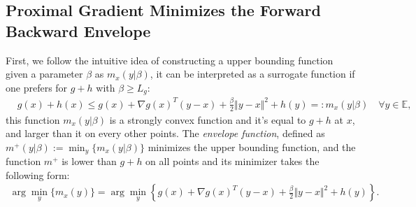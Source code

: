 \documentclass[]{article}
\theoremstyle{definition}
\begin{document}
    \subsection{Proximal Gradient Minimizes the Forward Backward Envelope}
        First, we follow the intuitive idea of constructing a upper bounding function given a parameter $\beta$ as  $m_x(y|\beta)$, it can be interpreted as a surrogate function if one prefers for $g + h$ with $\beta \ge L_g$: 
        \begin{align*}
            & g(x) + h(x) \le 
            g(x) + \nabla g(x)^T(y - x) + \frac{\beta}{2} \Vert y - x\Vert^2
            + h(y) =: m_x(y|\beta) \quad \forall y \in \mathbb E, 
        \end{align*}
        this function $m_x(y|\beta)$ is a strongly convex function and it's equal to $g + h$ at $x$, and larger than it on every other points. The \emph{envelope function}, defined as $m^+(y|\beta):= \min_y \{m_x(y|\beta)\}$ minimizes the upper bounding function, and the function $m^+$ is lower than $g + h$ on all points and its minimizer takes the following form: 
        \begin{align*}
            \arg\min_{y} \{m_x(y)\} 
            = \arg\min_{y}\left\lbrace
                g(x) + \nabla g(x)^T(y - x) + \frac{\beta}{2}
                \Vert y - x\Vert^2 + h(y) 
            \right\rbrace. 
        \end{align*}
        
\end{document}

